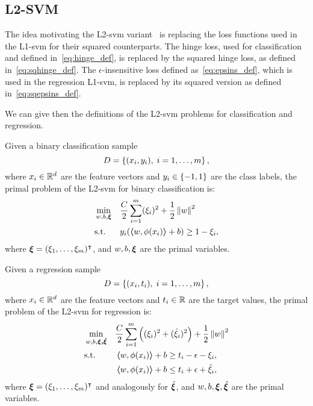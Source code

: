 \subsection{L2-SVM}
The idea motivating the L2-\acrshort{svm} variant~\citep{Burges98} is replacing the loss functions used in the L1-\acrshort{svm} for their squared counterparts. 
The hinge loss, used for classification and defined in~\eqref{eq:hinge_def}, is replaced by the squared hinge loss, as defined in~\eqref{eq:sqhinge_def}.
The $\epsilon$-insensitive loss defined as~\eqref{eq:epsins_def}, which is used in the regression L1-\acrshort{svm}, is replaced by its squared version as defined in~\eqref{eq:sqepsins_def}.
%

We can give then the definitions of the L2-\acrshort{svm} problems for classification and regression.
\begin{definition}
    Given a binary classification sample
    $$ D = \left\{(x_i, y_i), \; i=1, \ldots, m\right\} ,$$
    where $x_i \in \mathbb{R}^d$ are the feature vectors and $y_i \in \left\{-1, 1\right\}$ are the class labels, 
    the primal problem of the L2-\acrshort{svm} for binary classification is:
    \begin{equation}
        \label{eq:l2_primal_clas}
        \begin{aligned}
            &\min_{w, b, \fv{\xi}} & & \frac{C}{2} \sum_{i=1}^m (\xi_i)^2 + \frac{1}{2} \norm{w}^2 \\
            & \text{s.t.} & & y_i (\dotp{w}{\phi(x_i)} + b) \geq 1 - \xi_i , 
        \end{aligned}  
    \end{equation}
    where $\bm{\xi} = (\xi_1, \ldots, \xi_m)^\intercal$, and $w, b, \bm{\xi}$ are the primal variables.
\end{definition}
%
\begin{definition}
    Given a regression sample
    $$ D = \left\{(x_i, t_i), \; i=1, \ldots, m\right\} ,$$
    where $x_i \in \mathbb{R}^d$ are the feature vectors and $t_i \in \mathbb{R}$ are the target values, 
    the primal problem of the L2-\acrshort{svm} for regression is:
    \begin{equation}
        \label{eq:l2_primal_reg}
        \begin{aligned}
            &\min_{w, b, \fv{\xi, \hat{\fv{\xi}}}} & & \frac{C}{2} \sum_{i=1}^m \left((\xi_i)^2 + (\hat{\xi}_i)^2 \right) + \frac{1}{2} \norm{w}^2 \\
            & \text{s.t.} & & \dotp{w}{\phi(x_i)} + b \geq t_i - \epsilon - \xi_i  , \\
            & & & \dotp{w}{\phi(x_i)} + b \leq t_i + \epsilon + \hat{\xi}_i , 
        \end{aligned}  
    \end{equation}
    where $\bm{\xi} = (\xi_1, \ldots, \xi_m)^\intercal$ and analogously for $\hat{\bm{\xi}}$, and $w, b, \bm{\xi}, \hat{\bm{\xi}}$ are the primal variables.
\end{definition}
